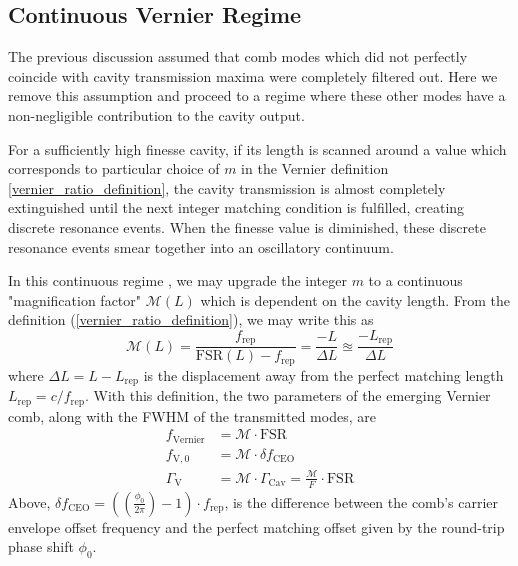 \documentclass[12pt]{report}
\begin{document}
	
	
	\subsection{Continuous Vernier Regime}
	The previous discussion assumed that comb modes which did not perfectly coincide with cavity transmission maxima were completely filtered out. Here we remove this assumption and proceed to a regime where these other modes have a non-negligible contribution to the cavity output.
	
	For a sufficiently high finesse cavity, if its length is scanned around a value which corresponds to particular choice of $m$ in the Vernier definition \ref{vernier_ratio_definition}, the cavity transmission is almost completely extinguished until the next integer matching condition is fulfilled, creating discrete resonance events. When the finesse value is diminished, these discrete resonance events smear together into an oscillatory continuum.
	
	In this continuous regime \cite{vernier_continuous_filtering}, we may upgrade the integer $m$ to a continuous "magnification factor" $\mathcal{M}(L)$ which is dependent on the cavity length. From the definition (\ref{vernier_ratio_definition}), we may write this as
	\begin{equation}
		\mathcal{M}(L) = \frac{f_\mathrm{rep}}{\mathrm{FSR}(L) - f_\mathrm{rep}} = \frac{-L}{\Delta L } \approxeq \frac{-L_\mathrm{rep}}{\Delta L}
	\end{equation}
	where $\Delta L = L - L_\mathrm{rep}$ is the displacement away from the perfect matching length $L_\mathrm{rep} = c/f_\mathrm{rep}$. With this definition, the two parameters of the emerging Vernier comb, along with the FWHM of the transmitted modes, are \cite{vernier_continuous_filtering}
	\begin{align}
		f_\mathrm{Vernier} &= \mathcal{M}\cdot \mathrm{FSR} \\
		f_\mathrm{V, 0} &= \mathcal{M} \cdot \delta f_\mathrm{CEO}\\
		\Gamma_\mathrm{V} &= \mathcal{M}\cdot \Gamma_\mathrm{Cav} = \frac{\mathcal{M}}{F} \cdot \mathrm{FSR}
	\end{align}
	Above, $\delta f_\mathrm{CEO} = ((\frac{\phi_0}{2\pi}) - 1)\cdot f_\text{rep}$, is the difference between the comb's carrier envelope offset frequency and the perfect matching offset given by the round-trip phase shift $\phi_0$.
	
\end{document}
